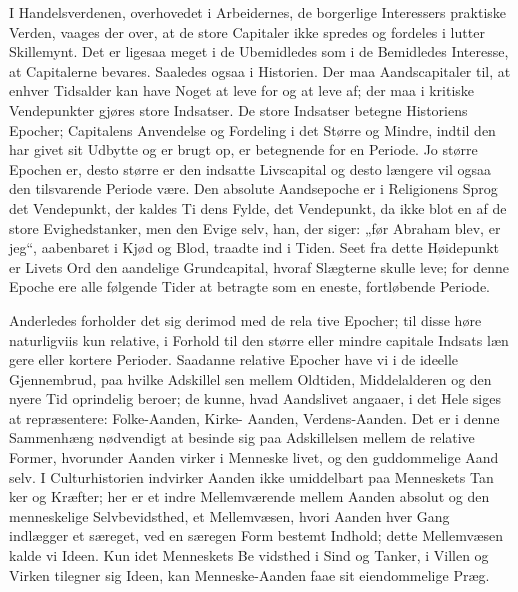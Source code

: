 \documentclass[12pt]{book}
\newcommand{\opage}[1]{\marginnote{\footnotesize\textit{[#1]}}}
\begin{document}
I Handelsverdenen, overhovedet i Arbeidernes, de
borgerlige Interessers praktiske Verden, vaages der over,
at de store Capitaler ikke spredes og fordeles i lutter
Skillemynt. Det er ligesaa meget i de Ubemidledes som i de
Bemidledes Interesse, at Capitalerne bevares. Saaledes
ogsaa i Historien. Der maa Aandscapitaler til, at enhver
Tidsalder kan have Noget at leve for og at leve af;
der maa i kritiske Vendepunkter gjøres store Indsatser.
De store Indsatser betegne Historiens Epocher; Capitalens
Anvendelse og Fordeling i det Større og Mindre, indtil
den har givet sit Udbytte og er brugt op, er betegnende
for en Periode. Jo større Epochen er, desto større er
den indsatte Livscapital og desto længere vil ogsaa den
tilsvarende Periode være. Den absolute Aandsepoche
er i Religionens Sprog det Vendepunkt, der kaldes Ti\-%
dens Fylde, det Vendepunkt, da ikke blot en af de
store Evighedstanker, men den Evige selv, han, der
siger: „før Abraham blev, er jeg“, aabenbaret i Kjød og
Blod, traadte ind i Tiden. Seet fra dette Høidepunkt er
Livets Ord den aandelige Grundcapital, hvoraf Slægterne
\opage{20}\setcounter{footnote}{0}%
skulle leve; for denne Epoche ere alle følgende Tider at
betragte som en eneste, fortløbende Periode.

Anderledes forholder det sig derimod med de rela\-%
tive Epocher; til disse høre naturligviis kun relative, i
Forhold til den større eller mindre capitale Indsats læn\-%
gere eller kortere Perioder. Saadanne relative Epocher
have vi i de ideelle Gjennembrud, paa hvilke Adskillel\-%
sen mellem Oldtiden, Middelalderen og den nyere Tid
oprindelig beroer; de kunne, hvad Aandslivet angaaer, i
det Hele siges at repræsentere: Folke-Aanden, Kirke-%
Aanden, Verdens-Aanden. Det er i denne Sammenhæng
nødvendigt at besinde sig paa Adskillelsen mellem de
relative Former, hvorunder Aanden virker i Menneske\-%
livet, og den guddommelige Aand selv. I Culturhistorien
indvirker Aanden ikke umiddelbart paa Menneskets Tan\-%
ker og Kræfter; her er et indre Mellemværende mellem
Aanden absolut og den menneskelige Selvbevidsthed, et
Mellemvæsen, hvori Aanden hver Gang indlægger et
særeget, ved en særegen Form bestemt Indhold; dette
Mellemvæsen kalde vi Ideen. Kun idet Menneskets Be\-%
vidsthed i Sind og Tanker, i Villen og Virken tilegner
sig Ideen, kan Menneske-Aanden faae sit eiendommelige
Præg.
\end{document}
